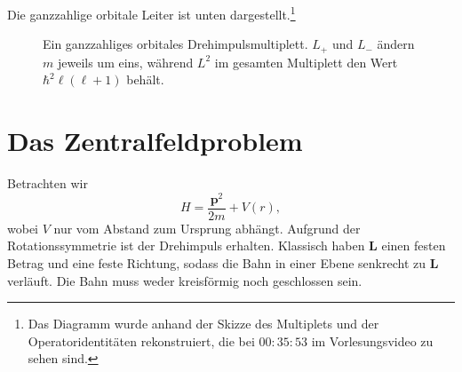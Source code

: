 Die ganzzahlige orbitale Leiter ist unten dargestellt.\footnote{Das Diagramm wurde anhand der Skizze des Multiplets und der Operatoridentitäten rekonstruiert, die bei \(00{:}35{:}53\) im Vorlesungsvideo zu sehen sind.}

\begin{figure}[htbp]\centering
{}\caption{Ein ganzzahliges orbitales Drehimpulsmultiplett. \(L_+\) und \(L_-\) ändern \(m\) jeweils um eins, während \(L^2\) im gesamten Multiplett den Wert \(\hbar^2\ell(\ell+1)\) behält.}\end{figure}

\section{Das Zentralfeldproblem}

Betrachten wir
\begin{equation}
H=\frac{\mathbf p^2}{2m}+V(r),
\end{equation}
wobei \(V\) nur vom Abstand zum Ursprung abhängt. Aufgrund der Rotationssymmetrie ist der Drehimpuls erhalten. Klassisch haben \(\mathbf L\) einen festen Betrag und eine feste Richtung, sodass die Bahn in einer Ebene senkrecht zu \(\mathbf L\) verläuft. Die Bahn muss weder kreisförmig noch geschlossen sein.

